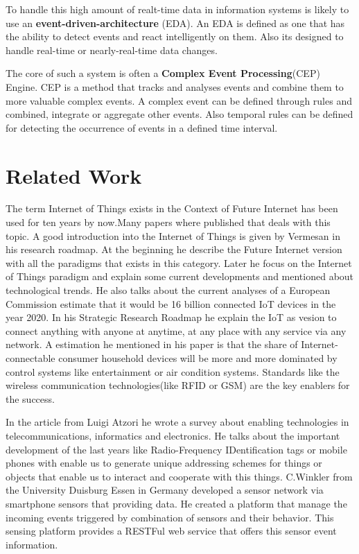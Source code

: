 \documentclass{acm_proc_article-sp}
\begin{document}
To handle this high amount of realt-time data in information systems is likely to use an \textbf{event-driven-architecture} (EDA). An EDA is defined as one that has the ability to detect events and react intelligently on them. Also its designed to handle real-time or nearly-real-time data changes.\cite{EDA:Taylor}

The core of such a system is often a \textbf{Complex Event Processing}(CEP) Engine.
CEP is a method that tracks and analyses events and combine them to more valuable complex events. A complex event can be defined through rules and combined, integrate or aggregate other events. Also temporal rules can be defined for detecting the occurrence of events in a defined time interval.

\section{Related Work}
\label{sec:Related Work}

The term Internet of Things exists in the Context of Future Internet has been used for ten years by now.Many papers where published that deals with this topic.
A good introduction into the Internet of Things is given by Vermesan in his research roadmap. At the beginning he describe the Future Internet version with all the paradigms that exists in this category\cite{vermesan2009internet}. Later he focus on the Internet of Things paradigm and explain some current developments and mentioned about technological trends.
He also talks about the current analyses of a European Commission estimate that it would be 16 billion connected IoT devices in the year 2020.
In his Strategic Research Roadmap he explain the IoT as vesion to connect anything with anyone at anytime, at any place with any service via any network.
A estimation he mentioned in his paper is that the share of Internet-connectable consumer household devices will be more and more dominated by control systems like entertainment or air condition systems.
Standards like the wireless communication technologies(like RFID or GSM) are the key enablers for the success.\cite{sundmaeker2010vision} 

In the article from Luigi Atzori he wrote a survey about enabling technologies in telecommunications, informatics and electronics. He talks about the important development of the last years like Radio-Frequency IDentification tags or mobile phones with enable us to generate unique addressing schemes for things or objects that enable us to interact and cooperate with this things\cite{atzori2010internet}.
C.Winkler from the University Duisburg Essen in Germany developed a sensor network via smartphone sensors that providing data\cite{sense-sation_winkler}.
He created a platform that manage the incoming events triggered by combination of sensors and their behavior.
This sensing platform provides a RESTFul web service that offers this sensor event information.
\end{document}
